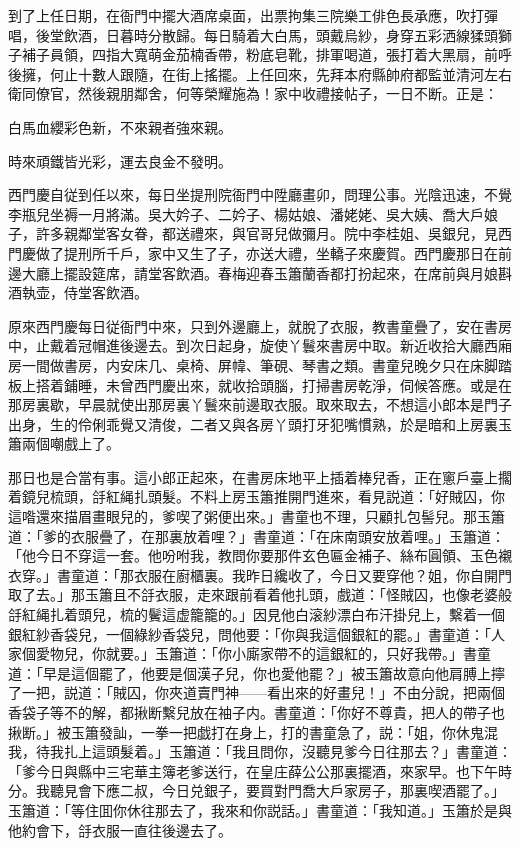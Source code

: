 到了上任日期，在衙門中擺大酒席桌面，出票拘集三院樂工俳色長承應，吹打彈唱，後堂飲酒，日暮時分散歸。每日騎着大白馬，頭戴烏紗，身穿五彩洒線猱頭獅子補子員領，四指大寬萌金茄楠香帶，粉底皂靴，排軍喝道，張打着大黑扇，前呼後擁，何止十數人跟隨，在街上搖擺。上任回來，先拜本府縣帥府都監並清河左右衛同僚官，然後親朋鄰舍，何等榮耀施為！家中收禮接帖子，一日不断。正是：

\begin{myquote}
白馬血纓彩色新，不來親者強來親。

時來頑鐵皆光彩，運去良金不發明。
\end{myquote}

西門慶自従到任以來，每日坐提刑院衙門中陞廳畫卯，問理公事。光陰迅速，不覺李瓶兒坐褥一月將滿。吳大妗子、二妗子、楊姑娘、潘姥姥、吳大姨、喬大戶娘子，許多親鄰堂客女眷，都送禮來，與官哥兒做彌月。院中李桂姐、吳銀兒，見西門慶做了提刑所千戶，家中又生了子，亦送大禮，坐轎子來慶賀。西門慶那日在前邊大廳上擺設筵席，請堂客飲酒。春梅迎春玉簫蘭香都打扮起來，在席前與月娘斟酒執壶，侍堂客飲酒。

原來西門慶每日従衙門中來，只到外邊廳上，就脫了衣服，教書童疊了，安在書房中，止戴着冠帽進後邊去。到次日起身，旋使丫鬟來書房中取。新近收拾大廳西廂房一間做書房，内安床几、桌椅、屏幃、筆硯、琴書之類。書童兒晚夕只在床脚踏板上搭着鋪睡，未曾西門慶出來，就收拾頭腦，打掃書房乾淨，伺候答應。或是在那房裏歇，早晨就使出那房裏丫鬟來前邊取衣服。取來取去，不想這小郎本是門子出身，生的伶俐乖覺又清俊，二者又與各房丫頭打牙犯嘴慣熟，於是暗和上房裏玉簫兩個嘲戲上了。

那日也是合當有事。這小郎正起來，在書房床地平上插着棒兒香，正在窻戶臺上擱着鏡兒梳頭，㧱紅䋲扎頭髮。不料上房玉簫推開門進來，看見説道：「好賊囚，你這喒還來描眉畫眼兒的，爹喫了粥便出來。」書童也不理，只顧扎包髻兒。那玉簫道：「爹的衣服疊了，在那裏放着哩？」書童道：「在床南頭安放着哩。」玉簫道：「他今日不穿這一套。他吩咐我，教問你要那件玄色匾金補子、絲布圓領、玉色襯衣穿。」書童道：「那衣服在廚櫃裏。我昨日纔收了，今日又要穿他？姐，你自開門取了去。」那玉簫且不㧱衣服，走來跟前看着他扎頭，戲道：「怪賊囚，也像老婆般㧱紅䋲扎着頭兒，梳的鬢這虚籠籠的。」因見他白滚紗漂白布汗掛兒上，繫着一個銀紅紗香袋兒，一個綠紗香袋兒，問他要：「你與我這個銀紅的罷。」書童道：「人家個愛物兒，你就要。」玉簫道：「你小廝家帶不的這銀紅的，只好我帶。」書童道：「早是這個罷了，他要是個漢子兒，你也愛他罷？」被玉簫故意向他肩膊上擰了一把，説道：「賊囚，你夾道賣門神——看出來的好畫兒！」不由分說，把兩個香袋子等不的解，都揪断繫兒放在袖子内。書童道：「你好不尊貴，把人的帶子也揪断。」被玉簫發訕，一拳一把戯打在身上，打的書童急了，説：「姐，你休鬼混我，待我扎上這頭髮着。」玉簫道：「我且問你，沒聽見爹今日往那去？」書童道：「爹今日與縣中三宅華主簿老爹送行，在皇庄薛公公那裏擺酒，來家早。也下午時分。我聽見會下應二叔，今日兑銀子，要買對門喬大戶家房子，那裏喫酒罷了。」玉簫道：「等住囬你休往那去了，我來和你説話。」書童道：「我知道。」玉簫於是與他約會下，㧱衣服一直往後邊去了。

